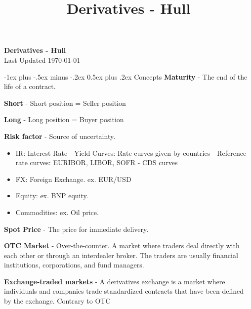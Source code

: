 \documentclass[10pt,landscape]{article}
\title{Derivatives - Hull}
\makeatletter
\renewcommand{\section}{\@startsection{section}{1}{0mm}%
                                {-1ex plus -.5ex minus -.2ex}%
                                {0.5ex plus .2ex}%
                                {\normalfont\large\bfseries}}
\makeatother
\begin{document}
\raggedright
\footnotesize

\begin{center}
    \vspace{-50mm}
    \Large{\vspace{-15mm}\textbf{Derivatives - Hull}} \\
    \footnotesize{Last Updated \today}
    \vspace{-.4mm}
\end{center}
\begin{multicols}{3}
    \setlength{\premulticols}{1pt}
    \setlength{\postmulticols}{1pt}
    \setlength{\multicolsep}{1pt}
    \setlength{\columnsep}{2pt}
    \section{Concepts}
    \textbf{Maturity} - The end of the life of a contract.
    
    \textbf{Short} - Short position = Seller position
    
    \textbf{Long} - Long position = Buyer position
    
    \textbf{Risk factor} - Source of uncertainty.
    \begin{itemize}[label={--},leftmargin=4mm]
        \vspace{-1mm}
        \itemsep -.4mm
        \item IR: Interest Rate
            \subitem - Yield Curves: Rate curves given by countries
            \subitem - Reference rate curves: EURIBOR, LIBOR, SOFR
            \subitem - CDS curves
        \item FX: Foreign Exchange. ex. EUR/USD
        \item Equity: ex. BNP equity.
        \item Commodities: ex. Oil price.

    \end{itemize}

    \textbf{Spot Price} - The price for immediate delivery.
    
    \textbf{OTC Market} - Over-the-counter. A market where traders deal directly with each other or through an interdealer broker. The traders are usually financial institutions, corporations, and fund managers.
    
    \textbf{Exchange-traded markets} - A derivatives exchange is a market where individuals and companies trade standardized contracts that have been defined by the exchange. Contrary to OTC
    

\end{multicols}
\end{document}
